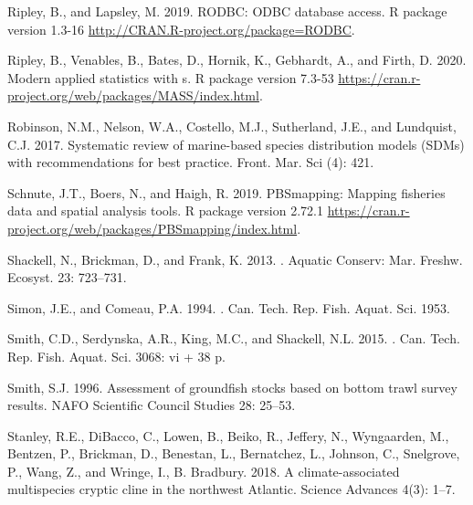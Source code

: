 \documentclass[12pt]{article}\usepackage[]{graphicx}\usepackage[]{color}
\begin{document}
\begin{CSLReferences}{1}{0}
\leavevmode\hypertarget{ref-R:package:RODBC}{}%
Ripley, B., and Lapsley, M. 2019. RODBC: ODBC database access. R package version 1.3-16 \url{http://CRAN.R-project.org/package=RODBC}.

\leavevmode\hypertarget{ref-R:package:MASS}{}%
Ripley, B., Venables, B., Bates, D., Hornik, K., Gebhardt, A., and Firth, D. 2020. Modern applied statistics with s. R package version 7.3-53 \url{https://cran.r-project.org/web/packages/MASS/index.html}.

\leavevmode\hypertarget{ref-Robinson:2017}{}%
Robinson, N.M., Nelson, W.A., Costello, M.J., Sutherland, J.E., and Lundquist, C.J. 2017. Systematic review of marine-based species distribution models ({SDM}s) with recommendations for best practice. Front. Mar. Sci (4): 421.

\leavevmode\hypertarget{ref-R:package:PBSmapping}{}%
Schnute, J.T., Boers, N., and Haigh, R. 2019. PBSmapping: Mapping fisheries data and spatial analysis tools. R package version 2.72.1 \url{https://cran.r-project.org/web/packages/PBSmapping/index.html}.

\leavevmode\hypertarget{ref-Shackell2013}{}%
Shackell, N., Brickman, D., and Frank, K. 2013. . Aquatic Conserv: Mar. Freshw. Ecosyst. 23: 723--731.

\leavevmode\hypertarget{ref-Simon:Comeau:1994}{}%
Simon, J.E., and Comeau, P.A. 1994. . Can. Tech. Rep. Fish. Aquat. Sci. 1953.

\leavevmode\hypertarget{ref-Smith2015}{}%
Smith, C.D., Serdynska, A.R., King, M.C., and Shackell, N.L. 2015. . Can. Tech. Rep. Fish. Aquat. Sci. 3068: vi + 38 p.

\leavevmode\hypertarget{ref-Smith:1996}{}%
Smith, S.J. 1996. Assessment of groundfish stocks based on bottom trawl survey results. {NAFO} Scientific Council Studies 28: 25--53.

\leavevmode\hypertarget{ref-Stanley:2018}{}%
Stanley, R.E., DiBacco, C., Lowen, B., Beiko, R., Jeffery, N., Wyngaarden, M., Bentzen, P., Brickman, D., Benestan, L., Bernatchez, L., Johnson, C., Snelgrove, P., Wang, Z., and Wringe, I., B. Bradbury. 2018. A climate-associated multispecies cryptic cline in the northwest {A}tlantic. Science {A}dvances 4(3): 1--7.


\end{CSLReferences}
\end{document}
